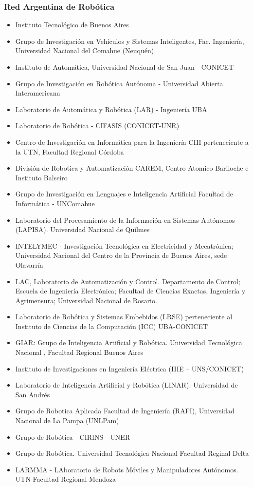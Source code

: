 \begin{frame}
    \frametitle{Red Argentina de Robótica}
    
    \tiny
    
    \begin{itemize}
    \item Instituto Tecnológico de Buenos Aires
    \item Grupo de Investigación en Vehículos y Sistemas Inteligentes, Fac. Ingeniería, Universidad Nacional del Comahue (Neuquén)
    \item Instituto de Automática, Universidad Nacional de San Juan - CONICET
    \item Grupo de Investigación en Robótica Autónoma - Universidad Abierta Interamericana
    \item Laboratorio de Automática y Robótica (LAR) - Ingeniería UBA
    \item Laboratorio de Robótica - CIFASIS (CONICET-UNR)
    \item Centro de Investigación en Informática para la Ingeniería CIII perteneciente a la UTN, Facultad Regional Córdoba
    \item División de Robotica y Automatización CAREM, Centro Atomico Bariloche e Instituto Balseiro
    \item Grupo  de Investigación en Lenguajes e Inteligencia Artificial Facultad de Informática - UNComahue
    \item Laboratorio del Procesamiento de la Información en Sistemas Autónomos (LAPISA). Universidad Nacional de Quilmes
    \item INTELYMEC - Investigación Tecnológica en Electricidad y Mecatrónica; Universidad Nacional del Centro de la Provincia de Buenos Aires, sede Olavarría
    \item LAC, Laboratorio de Automatización y Control. Departamento de Control; Escuela de Ingeniería Electrónica; Facultad de Ciencias Exactas, Ingeniería y Agrimensura; Universidad Nacional de Rosario.
    \item Laboratorio de Robótica y Sistemas Embebidos (LRSE) perteneciente al Instituto de Ciencias de la Computación (ICC) UBA-CONICET
    \item GIAR: Grupo de Inteligencia Artificial y Robótica. Universidad Tecnológica Nacional , Facultad Regional Buenos Aires
    \item Instituto de Investigaciones en Ingeniería Eléctrica (IIIE – UNS/CONICET)
    \item Laboratorio de Inteligencia Artificial y Robótica (LINAR). Universidad de San Andrés
    \item Grupo de Robotica Aplicada Facultad de Ingeniería (RAFI), Universidad Nacional de La Pampa (UNLPam)
    \item Grupo de Robótica - CIRINS - UNER
    \item Grupo de Robótica. Universidad Tecnológica Nacional Facultad Reginal Delta
    \item LARMMA - LAboratorio de Robots Móviles y Manipuladores Autónomos. UTN Facultad Regional Mendoza
    \end{itemize}
    
\end{frame}

